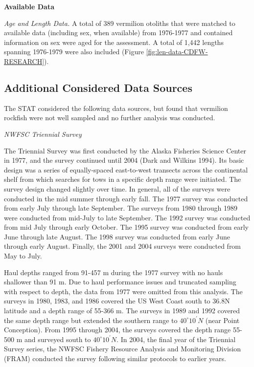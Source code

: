 \documentclass[11pt,
  english,
]{article}
\begin{document}
\textbf{Available Data}

\emph{Age and Length Data.} A total of 389 vermilion otoliths that were matched to available data (including sex, when available) from 1976-1977 and contained information on sex were aged for the assessment. A total of 1,442 lengths spanning 1976-1979 were also included (Figure \ref{fig:len-data-CDFW-RESEARCH}).


\hypertarget{additional-considered-data-sources}{%
\subsection{Additional Considered Data Sources}\label{additional-considered-data-sources}}

\leavevmode\tagmcend\tagstructend

The STAT considered the following data sources, but found that vermilion rockfish were not well sampled and no further analysis was conducted.

\emph{NWFSC Triennial Survey}

The Triennial Survey was first conducted by the Alaska Fisheries Science Center in 1977, and the survey continued until 2004 {(Dark and Wilkins 1994)\leavevmode\tagmcend\tagstructend}. Its basic design was a series of equally-spaced east-to-west transects across the continental shelf from which searches for tows in a specific depth range were initiated. The survey design changed slightly over time. In general, all of the surveys were conducted in the mid summer through early fall. The 1977 survey was conducted from early July through late September. The surveys from 1980 through 1989 were conducted from mid-July to late September. The 1992 survey was conducted from mid July through early October. The 1995 survey was conducted from early June through late August. The 1998 survey was conducted from early June through early August. Finally, the 2001 and 2004 surveys were conducted from May to July.

Haul depths ranged from 91-457 m during the 1977 survey with no hauls shallower than 91 m. Due to haul performance issues and truncated sampling with respect to depth, the data from 1977 were omitted from this analysis. The surveys in 1980, 1983, and 1986 covered the US West Coast south to 36.8\textdegree N latitude and a depth range of 55-366 m. The surveys in 1989 and 1992 covered the same depth range but extended the southern range to $40^\circ 10^\prime N$ (near Point Conception). From 1995 through 2004, the surveys covered the depth range 55-500 m and surveyed south to $40^\circ 10^\prime N$. In 2004, the final year of the Triennial Survey series, the NWFSC Fishery Resource Analysis and Monitoring Division (FRAM) conducted the survey following similar protocols to earlier years.
\end{document}
